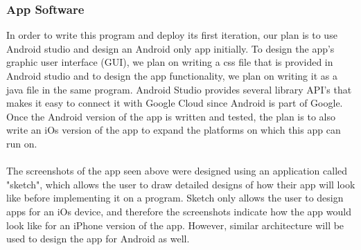 \documentclass[paper=a4, fontsize=12pt]{scrartcl}
\numberwithin{equation}{section}		%
\numberwithin{figure}{section}			%
\numberwithin{table}{section}				%
\begin{document}
\subsubsection{App Software}
In order to write this program and deploy its first iteration, our plan is to use Android studio and design an Android only app initially. To design the app's graphic user interface (GUI), we plan on writing a css file that is provided in Android studio and to design the app functionality, we plan on writing it as a java file in the same program. Android Studio provides several library API's that makes it easy to connect it with Google Cloud since Android is part of Google. Once the Android version of the app is written and tested, the plan is to also write an iOs version of the app to expand the platforms on which this app can run on.
\\\\
The screenshots of the app seen above were designed using an application called "sketch", which allows the user to draw detailed designs of how their app will look like before implementing it on a program. Sketch only allows the user to design apps for an iOs device, and therefore the screenshots indicate how the app would look like for an iPhone version of the app. However, similar architecture will be used to design the app for Android as well.
\end{document}
